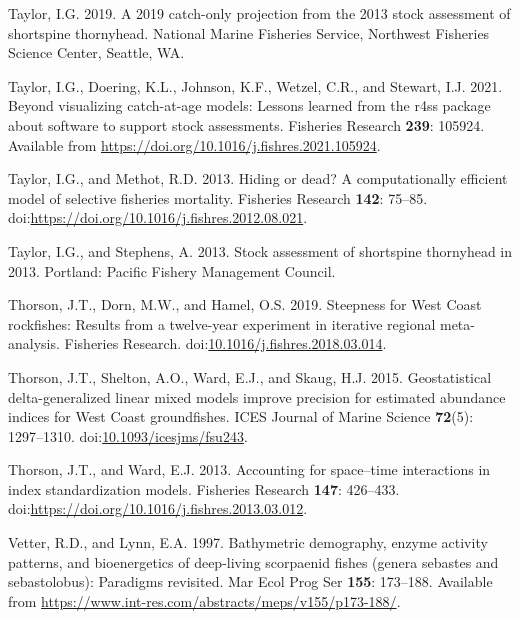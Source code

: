 \documentclass[11pt,
  english,
  letterpaper,
]{article}
\newlength{\cslhangindent}
\newenvironment{CSLReferences}[2] %
 {%
  \setlength{\parindent}{0pt}
  \ifodd #1 \everypar{\setlength{\hangindent}{\cslhangindent}}\ignorespaces\fi
  \ifnum #2 > 0
  \setlength{\parskip}{#2\baselineskip}
  \fi
 }%
 {}
\begin{document}
\begin{CSLReferences}{1}{0}
\leavevmode{}%
Taylor, I.G. 2019. A 2019 catch-only projection from the 2013 stock assessment of shortspine thornyhead. National Marine Fisheries Service, Northwest Fisheries Science Center, Seattle, {WA}.

\leavevmode{}%
Taylor, I.G., Doering, K.L., Johnson, K.F., Wetzel, C.R., and Stewart, I.J. 2021. Beyond visualizing catch-at-age models: Lessons learned from the r4ss package about software to support stock assessments. Fisheries Research \textbf{239}: 105924. Available from \url{https://doi.org/10.1016/j.fishres.2021.105924}.

\leavevmode{}%
Taylor, I.G., and Methot, R.D. 2013. Hiding or dead? A computationally efficient model of selective fisheries mortality. Fisheries Research \textbf{142}: 75--85. doi:\url{https://doi.org/10.1016/j.fishres.2012.08.021}.

\leavevmode{}%
Taylor, I.G., and Stephens, A. 2013. Stock assessment of shortspine thornyhead in 2013. Portland: Pacific Fishery Management Council.

\leavevmode{}%
Thorson, J.T., Dorn, M.W., and Hamel, O.S. 2019. Steepness for {West} {Coast} rockfishes: {Results} from a twelve-year experiment in iterative regional meta-analysis. Fisheries Research. doi:\href{https://doi.org/10.1016/j.fishres.2018.03.014}{10.1016/j.fishres.2018.03.014}.

\leavevmode{}%
Thorson, J.T., Shelton, A.O., Ward, E.J., and Skaug, H.J. 2015. {Geostatistical delta-generalized linear mixed models improve precision for estimated abundance indices for West Coast groundfishes}. ICES Journal of Marine Science \textbf{72}(5): 1297--1310. doi:\href{https://doi.org/10.1093/icesjms/fsu243}{10.1093/icesjms/fsu243}.

\leavevmode{}%
Thorson, J.T., and Ward, E.J. 2013. Accounting for space--time interactions in index standardization models. Fisheries Research \textbf{147}: 426--433. doi:\url{https://doi.org/10.1016/j.fishres.2013.03.012}.

\leavevmode{}%
Vetter, R.D., and Lynn, E.A. 1997. Bathymetric demography, enzyme activity patterns, and bioenergetics of deep-living scorpaenid fishes (genera sebastes and sebastolobus): Paradigms revisited. Mar Ecol Prog Ser \textbf{155}: 173--188. Available from \url{https://www.int-res.com/abstracts/meps/v155/p173-188/}.


\end{CSLReferences}
\end{document}

